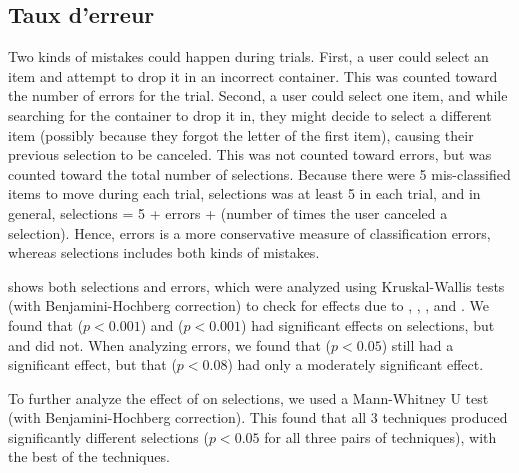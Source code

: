 \subsection{Taux d'erreur}
\label{subsec:experiment_results_errors}
Two kinds of mistakes could happen during trials. First, a user could select an item and attempt to drop it in an incorrect container. This was counted toward the number of errors for the trial. Second, a user could select one item, and while searching for the container to drop it in, they might decide to select a different item (possibly because they forgot the letter of the first item), causing their previous selection to be canceled. This was not counted toward errors, but was counted toward the total number of selections. Because there were 5 mis-classified items to move during each trial, selections was at least 5 in each trial, and in general, selections = 5 + errors + (number of times the user canceled a selection). Hence, errors is a more conservative measure of classification errors, whereas selections includes both kinds of mistakes.

 shows both selections and errors, which were analyzed using Kruskal-Wallis tests (with Benjamini-Hochberg correction) to check for effects due to , , , and . We found that  ($p < 0.001$) and  ($p < 0.001$) had significant effects on selections, but  and  did not. When analyzing errors, we found that  ($p<0.05$) still had a significant effect, but that  ($p<0.08$) had only a moderately significant effect.


To further analyze the effect of  on selections, we used a Mann-Whitney U test (with Benjamini-Hochberg correction). This found that all 3 techniques produced significantly different selections ($p < 0.05$ for all three pairs of techniques), with  the best of the techniques.


